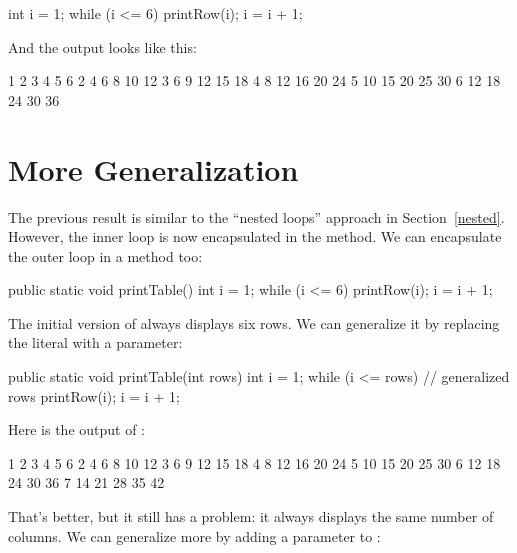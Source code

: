 \begin{code}
int i = 1;
while (i <= 6) {
    printRow(i);
    i = i + 1;
}
\end{code}

And the output looks like this:

\begin{stdout}
   1   2   3   4   5   6
   2   4   6   8  10  12
   3   6   9  12  15  18
   4   8  12  16  20  24
   5  10  15  20  25  30
   6  12  18  24  30  36
\end{stdout}



\section{More Generalization}

The previous result is similar to the ``nested loops'' approach in Section~\ref{nested}.
However, the inner loop is now encapsulated in the  method.
We can encapsulate the outer loop in a method too:

\begin{code}
public static void printTable() {
    int i = 1;
    while (i <= 6) {
        printRow(i);
        i = i + 1;
    }
}
\end{code}

The initial version of  always displays six rows.
We can generalize it by replacing the literal  with a parameter:

\begin{code}
public static void printTable(int rows) {
    int i = 1;
    while (i <= rows) {  // generalized rows
        printRow(i);
        i = i + 1;
    }
}
\end{code}

Here is the output of :

\begin{stdout}
   1   2   3   4   5   6
   2   4   6   8  10  12
   3   6   9  12  15  18
   4   8  12  16  20  24
   5  10  15  20  25  30
   6  12  18  24  30  36
   7  14  21  28  35  42
\end{stdout}

That's better, but it still has a problem: it always displays the same number of columns.
We can generalize more by adding a parameter to :

